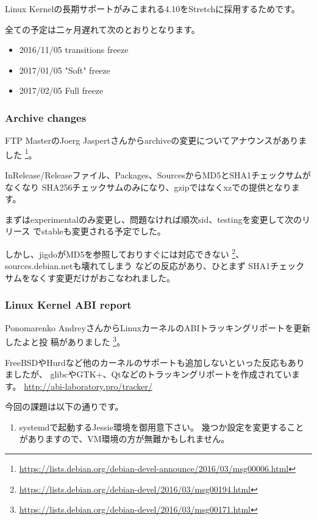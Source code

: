 \documentclass[mingoth,a4paper]{jsarticle}
\begin{document}
Linux Kernelの長期サポートがみこまれる4.10をStretchに採用するためです。

全ての予定は二ヶ月遅れて次のとおりとなります。

\begin{itemize}
\item 2016/11/05 transitions freeze
\item 2017/01/05 "Soft" freeze
\item 2017/02/05 Full freeze
\end{itemize}

\subsubsection {Archive changes}

FTP MasterのJoerg Jaspertさんからarchiveの変更についてアナウンスがありました%
\footnote{\url{https://lists.debian.org/debian-devel-announce/2016/03/msg00006.html}}。

InRelease/Releaseファイル、Packages、SourcesからMD5とSHA1チェックサムがなくなり
SHA256チェックサムのみになり、gzipではなくxzでの提供となります。

まずはexperimentalのみ変更し、問題なければ順次sid、testingを変更して次のリリース
でstableも変更される予定でした。

しかし、jigdoがMD5を参照しておりすぐには対応できない%
\footnote{\url{https://lists.debian.org/debian-devel/2016/03/msg00194.html}}、
sources.debian.netも壊れてしまう  などの反応があり、ひとまず
SHA1チェックサムをなくす変更だけがおこなわれました。


\subsubsection {Linux Kernel ABI report}

Ponomarenko AndreyさんからLinuxカーネルのABIトラッキングリポートを更新したよと投
稿がありました%
\footnote{\url{https://lists.debian.org/debian-devel/2016/03/msg00171.html}}。

FreeBSDやHurdなど他のカーネルのサポートも追加しないといった反応もありましたが、
glibcやGTK+、Qtなどのトラッキングリポートを作成されています。
\url{http://abi-laboratory.pro/tracker/}


今回の課題は以下の通りです。
\begin{screen}
  \begin{enumerate}
  \item %
    systemdで起動するJessie環境を御用意下さい。
    幾つか設定を変更することがありますので、VM環境の方が無難かもしれません。

  \end{enumerate}
\end{screen}
\end{document}

